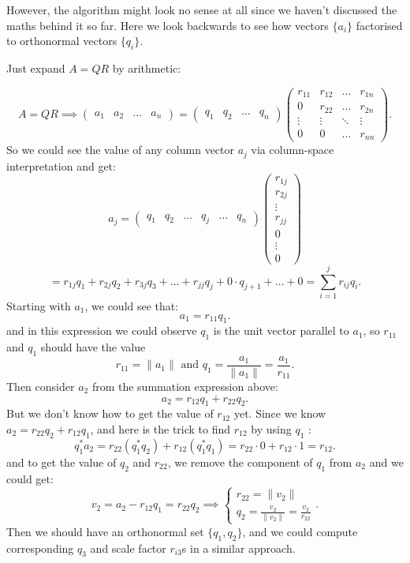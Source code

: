 \noindent However, the algorithm might look no sense at all since we haven't discussed the maths behind it so far. Here we look backwards to see how vectors $ \{a_i\} $ factorised to orthonormal vectors $ \{q_i\} $. \medskip

\noindent Just expand $A = QR$ by arithmetic:

 \[
   A = QR \implies \begin{pmatrix} a_1 & a_2 & \ldots & a_n \end{pmatrix} = 
   \begin{pmatrix} 
     q_1 & q_2 & \ldots & q_n 
  \end{pmatrix} 
   \begin{pmatrix} 
     r_{11} & r_{12} & \ldots & r_{1n} \\ 
     0 & r_{22} & \ldots & r_{2n} \\
     \vdots & \vdots & \ddots & \vdots \\
     0 & 0 & \ldots & r_{nn}
   \end{pmatrix}  
.\] 
So we could see the value of any column vector $a_j$ via column-space interpretation and get:
\[
  a_j = 
   \begin{pmatrix} 
     q_1 & q_2 & \ldots & q_j & \ldots & q_n 
  \end{pmatrix} 
  \begin{pmatrix} r_{1j}\\ r_{2j} \\ \vdots\\ r_{jj} \\ 0 \\ \vdots \\ 0 \end{pmatrix}
\] 
\[
  = r_{1j} q_1 + r_{2j}q_2 + r_{3j}q_3 + \ldots + r_{jj}q_j + 0 \cdot q_{j + 1} + \ldots + 0
  = \sum_{i=1}^{j} r_{ij}q_i
.\] 
Starting with $a_1$, we could see that:
 \[
a_1 = r_{11} q_1
.\] 
and in this expression we could observe $q_1$ is the unit vector parallel to $a_1$, so $r_{11}$ and $q_1$ should have the value
\[
r_{11} = \|a_1\| \text{ and } q_1 = \frac{a_1}{\|a_1\|} = \frac{a_1}{r_{11}}
.\]
Then consider $a_2$ from the summation expression above:
 \[
a_2 = r_{12}q_1 + r_{22}q_2
.\]
But we don't know how to get the value of $r_{12}$ yet. Since we know $a_2 = r_{22}q_2 + r_{12}q_1$, and here is the trick to find \(r_{12}\) by using \(q_1\)  :
\[
  q_1^* a_2 = r_{22}(q_1^{*}q_2) + r_{12}(q_1^{*}q_1) = r_{22} \cdot 0 + r_{12} \cdot 1 = r_{12}
.\]
and to get the value of $q_2$ and $r_{22}$, we remove the component of $q_1$ from $a_2$ and we could get:
\[
    v_2 = a_2 - r_{12}q_1 = r_{22}q_2 \implies 
    \left\{
      \begin{array}{l}
      r_{22} = \|v_2\| \\
      q_2 = \frac{v_2}{\|v_2\|} = \frac{v_2}{r_{22}}
      \end{array}
    \right.
.\]
Then we should have an orthonormal set $ \{q_1, q_2\} $, and we could compute corresponding $q_3$ and scale factor $r_{i3}$s in a similar approach. \medskip

